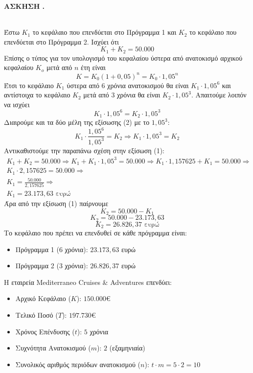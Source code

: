 \documentclass[11pt,a4paper]{article}
\newcommand{\kerkissans}[1]{{\fontfamily{maksf}\selectfont \textbf{#1}}}
\newcounter{askhsh}
\newcommand{\askhsh}{\kerkissans{\Large{ΑΣΚΗΣΗ \theaskhsh.\\}}\ \addtocounter{askhsh}{1}}
\newcommand{\eng}[1]{\selectlanguage{english}#1\selectlanguage{greek}}
\begin{document}
\askhsh\vspace{-5mm}
\begin{Alist}
\item
Έστω $K_1$ το κεφάλαιο που επενδύεται στο Πρόγραμμα 1 και $K_2$ το κεφάλαιο που επενδύεται στο Πρόγραμμα 2. Ισχύει ότι
\begin{equation}
K_1 + K_2 = 50.000
\end{equation}
Επίσης ο τύπος για τον υπολογισμό του κεφαλαίου ύστερα από ανατοκισμό αρχικού κεφαλαίου $K_o$ μετά από $n$ έτη είναι
\[ K=K_0\left(1+0{,}05\right)^n=K_0\cdot 1{,}05^n \]
Έτσι το κεφάλαιο $K_1$ ύστερα από $6$ χρόνια ανατοκισμού θα είναι $K_1\cdot 1{,}05^6$ και αντίστοιχα το κεφάλαιο $K_2$ μετά από $3$ χρόνια θα είναι $K_2\cdot 1{,}05^3$. Απαιτούμε λοιπόν να ισχύει
    \begin{equation}
        K_1 \cdot 1,05^6 = K_2 \cdot 1,05^3
    \end{equation}
Διαιρούμε και τα δύο μέλη της εξίσωσης (2) με το $1,05^3$:
$$K_1 \cdot \frac{1,05^6}{1{,}05^3} = K_2\Rightarrow K_1 \cdot 1{,}05^3 = K_2$$
Αντικαθιστούμε την παραπάνω σχέση στην εξίσωση (1):
\begin{gather*}
K_1+Κ_2 = 50.000\Rightarrow K_1+K_1\cdot 1{,}05^3=50.000\Rightarrow
K_1 \cdot 1,157625 + K_1 = 50.000\Rightarrow\\
K_1 \cdot 2,157625 = 50.000\Rightarrow\\
K_1 = \frac{50.000}{2,157625}\Rightarrow\\
K_1 = 23.173,63 \text{ ευρώ}
\end{gather*}
Άρα από την εξίσωση (1) παίρνουμε
$$K_2 = 50.000 - K_1$$
$$K_2 = 50.000 - 23.173,63$$
$$K_2 = 26.826,37 \text{ ευρώ}$$
Το κεφάλαιο που πρέπει να επενδυθεί σε κάθε πρόγραμμα είναι:
\begin{itemize}
    \item {Πρόγραμμα 1} (6 χρόνια): ${23.173,63}$ ευρώ
    \item {Πρόγραμμα 2} (3 χρόνια): ${26.826,37}$ ευρώ
\end{itemize}
\item Η εταιρεία \eng{Mediterraneo Cruises \& Adventures} επενδύει:
\begin{itemize}
    \item Αρχικό Κεφάλαιο ($K$): $150.000€$
    \item Τελικό Ποσό ($T$): $197.730€$
    \item Χρόνος Επένδυσης ($t$): $5$ χρόνια
    \item Συχνότητα Ανατοκισμού ($m$): $2$ (εξαμηνιαία)
    \item Συνολικός αριθμός περιόδων ανατοκισμού ($n$): $t \cdot m = 5 \cdot 2 = 10$
\end{itemize}


\end{Alist}
\end{document}
